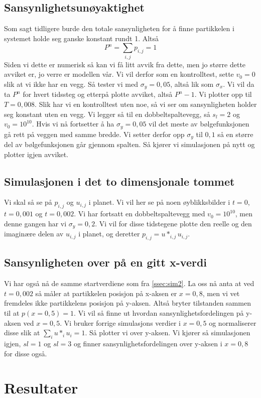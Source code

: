 \documentclass[reprint,english,notitlepage]{revtex4-2}  %
\begin{document}
\subsection{Sansynlighetsunøyaktighet}
Som sagt tidligere burde den totale sansynligheten for å finne partikkelen i systemet holde seg ganske konstant rundt 1. Altså
$$
P^n=\sum_{i,j}p_{i,j}=1
$$
Siden vi dette er numerisk så kan vi få litt avvik fra dette, men jo større dette avviket er, jo verre er modellen vår.  Vi vil derfor som en kontrolltest, sette $v_0=0$ slik at vi ikke har en vegg. Så tester vi med $\sigma_y=0,05$, altså lik som $\sigma_x$. Vi vil da ta $P^n$ for hvert tidssteg og etterpå plotte avviket, altså $P^n-1$. Vi plotter opp til $T=0,008$. Slik har vi en kontrolltest uten noe, så vi ser om sansynligheten holder seg konstant uten en vegg.
\newline Vi legger så til en dobbeltspaltevegg, så $s_l=2$ og $v_0=10^10$. Hvis vi nå fortsetter å ha $\sigma_y=0,05$ vil det meste av bølgefunksjonen gå rett på veggen med samme bredde. Vi setter derfor opp $\sigma_y$ til $0,1$ så en større del av bølgefunksjonen går gjennom spalten. Så kjører vi simulasjonen på nytt og plotter igjen avviket.
\subsection{Simulasjonen i det to dimensjonale tommet}\label{ssec:sim2}
Vi skal så se på $p_{i,j}$ og $u_{i,j}$ i planet. Vi vil her se på noen øyblikksbilder i $t=0$, $t=0,001$ og $t=0,002$. Vi har fortsatt en dobbeltspaltevegg med $v_0=10^10$, men denne gangen har vi $\sigma_y=0,2$.
Vi vil for disse tidstegene plotte den reelle og den imaginære delen av $u_{i,j}$ i planet, og deretter $p_{i,j}=u*_{i,j}u_{i,j}$.
\subsection{Sansynligheten over på en gitt x-verdi}
Vi har også nå de samme startverdiene som fra \autoref{ssec:sim2}. La oss nå anta at ved $t=0,002$ så måler at partikkelen posisjon på x-aksen er $x=0,8$, men vi vet fremdeles ikke partikkelens posisjon på y-aksen. Altså bryter tilstanden sammen til at $p(x=0,5)=1$. Vi vil så finne ut hvordan sansynlighetsfordelingen på y-aksen ved $x=0,5$. Vi bruker forrige simulasjons verdier i $x=0,5$ og normaliserer disse slik at $\sum_{i}u*_iu_i=1$. Så plotter vi over y-aksen. Vi kjører så simulasjonen igjen, $sl=1$ og $sl=3$ og finner sansynlighetsfordelingen over y-aksen i $x=0,8$ for disse også. 
\section{Resultater}
\end{document}
